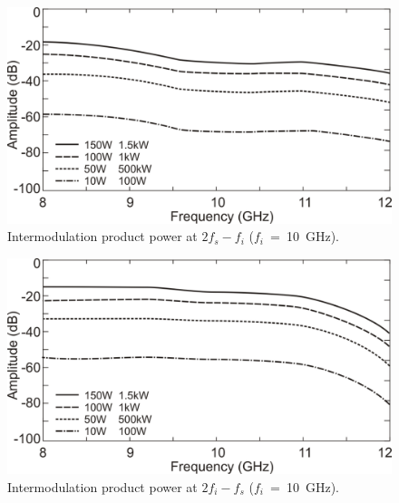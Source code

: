 \begin{figure}[!ht]
\centering
\includegraphics[width=12cm]{f1}
\caption{Intermodulation product power at $2 f_s - f_i$ ($f_i$~=~10~GHz).}
\label{fig:f1}
\end{figure}

\begin{figure}[!ht]
\centering
\includegraphics[width=12cm]{f2}
\caption{Intermodulation product power at $2 f_i - f_s$ ($f_i$~=~10~GHz).}
\label{fig:f2}
\end{figure}

